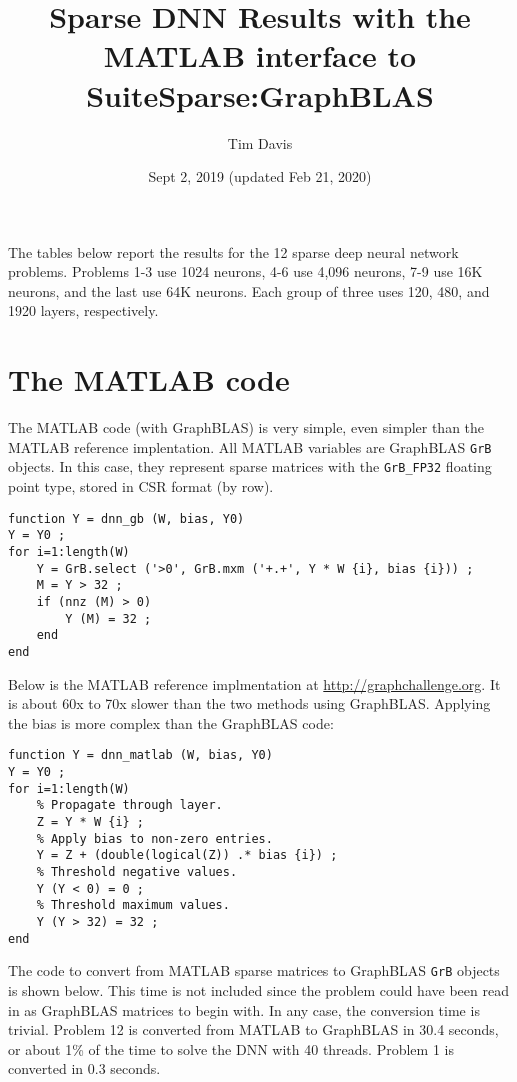 \documentclass[12pt]{article}
\title{Sparse DNN Results with the MATLAB interface to SuiteSparse:GraphBLAS}
\author{Tim Davis}
\date{Sept 2, 2019 (updated Feb 21, 2020)}
\begin{document}
\maketitle

The tables below report the results for the 12 sparse deep neural network
problems.  Problems 1-3 use 1024 neurons, 4-6 use 4,096 neurons, 7-9 use 16K
neurons, and the last use 64K neurons.  Each group of three uses 120, 480, and
1920 layers, respectively.

\section{The MATLAB code}

The MATLAB code (with GraphBLAS) is very simple, even simpler than the MATLAB
reference implentation.  All MATLAB variables are GraphBLAS \verb'GrB' objects.
In this case, they represent sparse matrices with the \verb'GrB_FP32' floating
point type, stored in CSR format (by row).

{\footnotesize
\begin{verbatim}
function Y = dnn_gb (W, bias, Y0)
Y = Y0 ;
for i=1:length(W)
    Y = GrB.select ('>0', GrB.mxm ('+.+', Y * W {i}, bias {i})) ;
    M = Y > 32 ;
    if (nnz (M) > 0)
        Y (M) = 32 ;
    end
end
\end{verbatim}}

Below is the MATLAB reference implmentation at \newline
\url{http://graphchallenge.org}.  It is about 60x to 70x slower than the two
methods using GraphBLAS.  Applying the bias is more complex than the GraphBLAS
code:

{\footnotesize
\begin{verbatim}
function Y = dnn_matlab (W, bias, Y0)
Y = Y0 ;
for i=1:length(W)
    % Propagate through layer.
    Z = Y * W {i} ;
    % Apply bias to non-zero entries.
    Y = Z + (double(logical(Z)) .* bias {i}) ;
    % Threshold negative values.
    Y (Y < 0) = 0 ;
    % Threshold maximum values.
    Y (Y > 32) = 32 ;
end
\end{verbatim}}

The code to convert from MATLAB sparse matrices to GraphBLAS \verb'GrB' objects
is shown below.  This time is not included since the problem could have been
read in as GraphBLAS matrices to begin with.  In any case, the conversion time
is trivial.  Problem 12 is converted from MATLAB to GraphBLAS in 30.4 seconds,
or about 1\% of the time to solve the DNN with 40 threads.  Problem 1 is
converted in 0.3 seconds.
\end{document}

